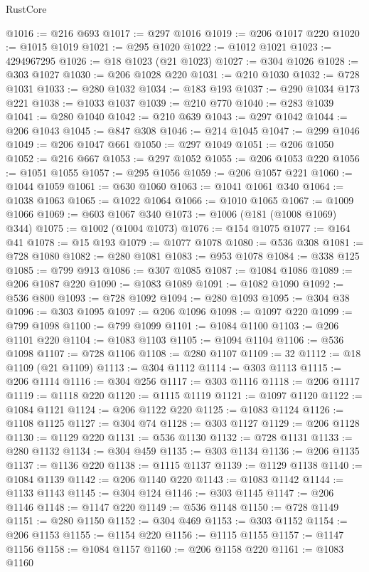 \begin{lexlean}{RustCore}
\begin{coremodule}
@1016 := @216 @693
@1017 := @297 @1016
@1019 := @206 @1017 @220
@1020 := @1015 @1019
@1021 := @295 @1020
@1022 := @1012 @1021
@1023 := 4294967295
@1026 := @18 @1023 (@21 @1023)
@1027 := @304 @1026
@1028 := @303 @1027
@1030 := @206 @1028 @220
@1031 := @210 @1030
@1032 := @728 @1031
@1033 := @280 @1032
@1034 := @183 @193
@1037 := @290 @1034 @173 @221
@1038 := @1033 @1037
@1039 := @210 @770
@1040 := @283 @1039
@1041 := @280 @1040
@1042 := @210 @639
@1043 := @297 @1042
@1044 := @206 @1043
@1045 := @847 @308
@1046 := @214 @1045
@1047 := @299 @1046
@1049 := @206 @1047 @661
@1050 := @297 @1049
@1051 := @206 @1050
@1052 := @216 @667
@1053 := @297 @1052
@1055 := @206 @1053 @220
@1056 := @1051 @1055
@1057 := @295 @1056
@1059 := @206 @1057 @221
@1060 := @1044 @1059
@1061 := @630 @1060
@1063 := @1041 @1061 @340
@1064 := @1038 @1063
@1065 := @1022 @1064
@1066 := @1010 @1065
@1067 := @1009 @1066
@1069 := @603 @1067 @340
@1073 := @1006 (@181 (@1008 @1069) @344)
@1075 := @1002 (@1004 @1073)
@1076 := @154 @1075
@1077 := @164 @41
@1078 := @15 @193
@1079 := @1077 @1078
@1080 := @536 @308
@1081 := @728 @1080
@1082 := @280 @1081
@1083 := @953 @1078
@1084 := @338 @125
@1085 := @799 @913
@1086 := @307 @1085
@1087 := @1084 @1086
@1089 := @206 @1087 @220
@1090 := @1083 @1089
@1091 := @1082 @1090
@1092 := @536 @800
@1093 := @728 @1092
@1094 := @280 @1093
@1095 := @304 @38
@1096 := @303 @1095
@1097 := @206 @1096
@1098 := @1097 @220
@1099 := @799 @1098
@1100 := @799 @1099
@1101 := @1084 @1100
@1103 := @206 @1101 @220
@1104 := @1083 @1103
@1105 := @1094 @1104
@1106 := @536 @1098
@1107 := @728 @1106
@1108 := @280 @1107
@1109 := 32
@1112 := @18 @1109 (@21 @1109)
@1113 := @304 @1112
@1114 := @303 @1113
@1115 := @206 @1114
@1116 := @304 @256
@1117 := @303 @1116
@1118 := @206 @1117
@1119 := @1118 @220
@1120 := @1115 @1119
@1121 := @1097 @1120
@1122 := @1084 @1121
@1124 := @206 @1122 @220
@1125 := @1083 @1124
@1126 := @1108 @1125
@1127 := @304 @74
@1128 := @303 @1127
@1129 := @206 @1128
@1130 := @1129 @220
@1131 := @536 @1130
@1132 := @728 @1131
@1133 := @280 @1132
@1134 := @304 @459
@1135 := @303 @1134
@1136 := @206 @1135
@1137 := @1136 @220
@1138 := @1115 @1137
@1139 := @1129 @1138
@1140 := @1084 @1139
@1142 := @206 @1140 @220
@1143 := @1083 @1142
@1144 := @1133 @1143
@1145 := @304 @124
@1146 := @303 @1145
@1147 := @206 @1146
@1148 := @1147 @220
@1149 := @536 @1148
@1150 := @728 @1149
@1151 := @280 @1150
@1152 := @304 @469
@1153 := @303 @1152
@1154 := @206 @1153
@1155 := @1154 @220
@1156 := @1115 @1155
@1157 := @1147 @1156
@1158 := @1084 @1157
@1160 := @206 @1158 @220
@1161 := @1083 @1160

\end{coremodule}
\end{lexlean}
